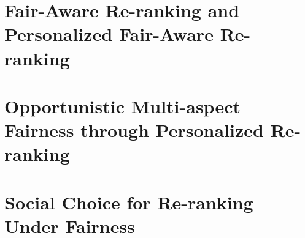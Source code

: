 

\section{Fair-Aware Re-ranking and Personalized Fair-Aware Re-ranking }
    
    \clearpage
    

\section{Opportunistic Multi-aspect Fairness through Personalized Re-ranking}
    
    \clearpage
\section{Social Choice for Re-ranking Under Fairness}
    
    


